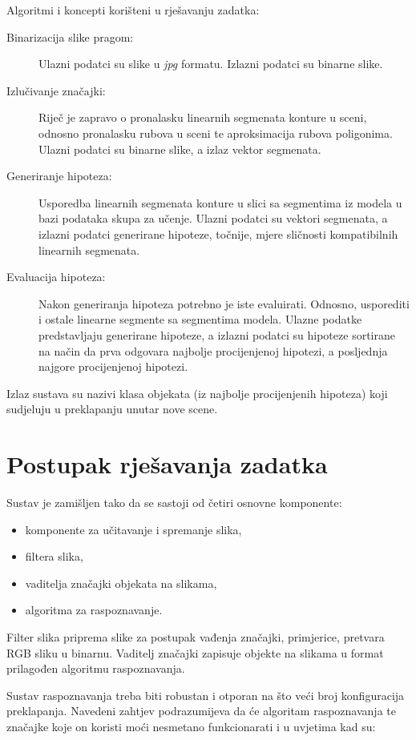 \documentclass[lmodern, utf8, seminar, numeric]{fer}
\begin{document}
Algoritmi i koncepti korišteni u rješavanju zadatka:
\begin{description}
\item[Binarizacija slike pragom:] Ulazni podatci su slike u \emph{jpg} formatu. Izlazni podatci su binarne slike.
\item[Izlučivanje značajki:]  Riječ je zapravo o pronalasku linearnih segmenata konture u sceni, odnosno pronalasku rubova u sceni te aproksimacija rubova poligonima. Ulazni podatci su binarne slike, a izlaz vektor segmenata.
\item[Generiranje hipoteza:] Usporedba linearnih segmenata konture u slici sa segmentima iz modela u bazi podataka skupa za učenje. Ulazni podatci su vektori segmenata, a izlazni podatci generirane hipoteze, točnije, mjere sličnosti kompatibilnih linearnih segmenata.
\item[Evaluacija hipoteza:] Nakon generiranja hipoteza potrebno je iste evaluirati. Odnosno, usporediti i ostale linearne segmente sa segmentima modela. Ulazne podatke predstavljaju generirane hipoteze, a izlazni podatci su hipoteze sortirane na način da prva odgovara najbolje procijenjenoj hipotezi, a posljednja najgore procijenjenoj hipotezi.
\end{description}

Izlaz sustava su nazivi klasa objekata (iz najbolje procijenjenih hipoteza) koji
sudjeluju u preklapanju unutar nove scene.


\chapter{Postupak rješavanja zadatka}

Sustav je zamišljen tako da se sastoji od četiri osnovne komponente:
\begin{itemize}
\item komponente za učitavanje i spremanje slika,
\item filtera slika,
\item vaditelja značajki objekata na slikama,
\item algoritma za raspoznavanje.
\end{itemize}

Filter slika priprema slike za postupak vađenja značajki, primjerice, pretvara
RGB sliku u binarnu. Vaditelj značajki zapisuje objekte na slikama u format
prilagođen algoritmu raspoznavanja.

Sustav raspoznavanja treba biti robustan i otporan na što veći broj
konfiguracija preklapanja. Navedeni zahtjev podrazumijeva da će algoritam
raspoznavanja te značajke koje on koristi moći nesmetano funkcionarati i u
uvjetima kad su:
\end{document}
